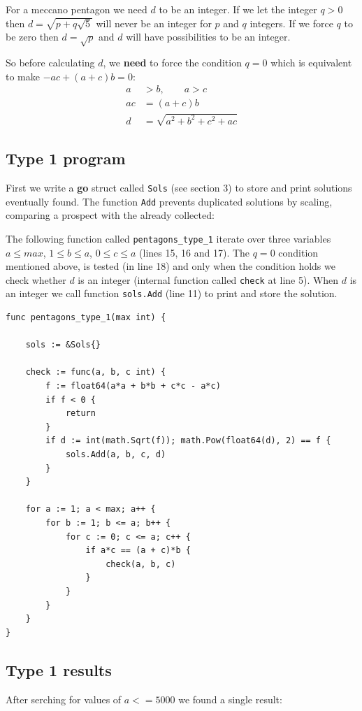\documentclass[11pt]{article}
\begin{document}
For a meccano pentagon we need $d$ to be an integer. If we let the integer $q > 0$ then $d = \sqrt{p + q\sqrt{5}}$ will never be an integer for $p$ and $q$ integers. If we force $q$ to be zero then $d = \sqrt{p}$ and $d$ will have possibilities to be an integer.

So before calculating $d$, we \textbf{need} to force the condition $q = 0$ which is 
equivalent to make $-ac + (a+c)b = 0$:
\begin{align}
a  & > b, \qquad a > c\\
ac &= (a + c)b\\
 d &= \sqrt{a^2 + b^2 + c^2 + ac}
\end{align}

\subsection{Type 1 program}

First we write a \textbf{go} struct called \texttt{Sols} (see section 3) to store and print solutions 
eventually found. The function \texttt{Add} prevents duplicated solutions by scaling,
comparing a prospect with the already collected:

The following function called \texttt{pentagons\_type\_1} iterate over three variables 
$a \leq max$, $1 \leq b \leq a$, $0 \leq c \leq a$ (lines 15, 16 and 17).
The $q = 0$ condition mentioned above, is tested (in line 18) and only when the condition holds
we check whether $d$ is an integer (internal function called \texttt{check} at line 5).
When $d$ is an integer we call function \texttt{sols.Add} (line 11) to print and store the 
solution.
\begin{lstlisting}
func pentagons_type_1(max int) {

	sols := &Sols{}

	check := func(a, b, c int) {
		f := float64(a*a + b*b + c*c - a*c)
		if f < 0 {
			return
		}
		if d := int(math.Sqrt(f)); math.Pow(float64(d), 2) == f {
			sols.Add(a, b, c, d)
		}
	}

	for a := 1; a < max; a++ {
		for b := 1; b <= a; b++ {
			for c := 0; c <= a; c++ {
				if a*c == (a + c)*b {
					check(a, b, c)
				}
			}
		}
	}
}
\end{lstlisting}

\subsection{Type 1 results}
After serching for values of $a <= 5000$ we found a single result:
\end{document}

